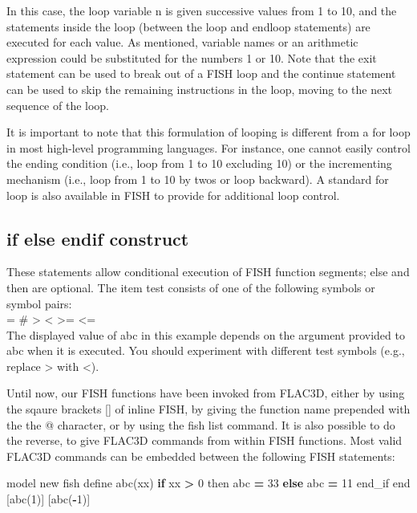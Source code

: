 \documentclass[a4paper, nobind]{templates/ociamthesis}
\newenvironment{Shaded}{\begin{snugshade}}{\end{snugshade}}
\newcommand{\ControlFlowTok}[1]{\textcolor[rgb]{0.13,0.29,0.53}{\textbf{#1}}}
\newcommand{\DecValTok}[1]{\textcolor[rgb]{0.00,0.00,0.81}{#1}}
\newcommand{\NormalTok}[1]{#1}
\newcommand{\OperatorTok}[1]{\textcolor[rgb]{0.81,0.36,0.00}{\textbf{#1}}}
\renewenvironment{Shaded}
{
  \vspace{10pt}%
  \begin{snugshade}%
}{%
  \end{snugshade}%
  \vspace{8pt}%
}
\begin{document}
In this case, the loop variable n is given successive values from 1 to
10, and the statements inside the loop (between the loop and endloop
statements) are executed for each value. As mentioned, variable names or
an arithmetic expression could be substituted for the numbers 1 or 10.
Note that the exit statement can be used to break out of a FISH loop and
the continue statement can be used to skip the remaining instructions in
the loop, moving to the next sequence of the loop.

It is important to note that this formulation of looping is different
from a for loop in most high-level programming languages. For instance,
one cannot easily control the ending condition (i.e., loop from 1 to 10
excluding 10) or the incrementing mechanism (i.e., loop from 1 to 10 by
twos or loop backward). A standard for loop is also available in FISH to
provide for additional loop control.

\hypertarget{if-else-endif-construct}{%
\subsection{if else endif construct}\label{if-else-endif-construct}}

These statements allow conditional execution of FISH function segments;
else and then are optional. The item test consists of one of the
following symbols or symbol pairs:\\

= \# \textgreater{} \textless{} \textgreater= \textless=\\

The displayed value of abc in this example depends on the argument
provided to abc when it is executed. You should experiment with
different test symbols (e.g., replace \textgreater{} with \textless).

Until now, our FISH functions have been invoked from FLAC3D, either by
using the sqaure brackets {[}{]} of inline FISH, by giving the function name
prepended with the the @ character, or by using the fish list command.
It is also possible to do the reverse, to give FLAC3D commands from
within FISH functions. Most valid FLAC3D commands can be embedded
between the following FISH statements:

\begin{Shaded}
\begin{Highlighting}[]
\NormalTok{model new}
\NormalTok{fish define abc(xx)}
    \ControlFlowTok{if}\NormalTok{ xx }\OperatorTok{\textgreater{}} \DecValTok{0}\NormalTok{ then }
\NormalTok{        abc }\OperatorTok{=} \DecValTok{33}
    \ControlFlowTok{else}
\NormalTok{        abc }\OperatorTok{=} \DecValTok{11}
\NormalTok{    end\_if}
\NormalTok{end}
\NormalTok{[abc(}\DecValTok{1}\NormalTok{)]}
\NormalTok{[abc(}\OperatorTok{{-}}\DecValTok{1}\NormalTok{)]}
\end{Highlighting}
\end{Shaded}
\end{document}
